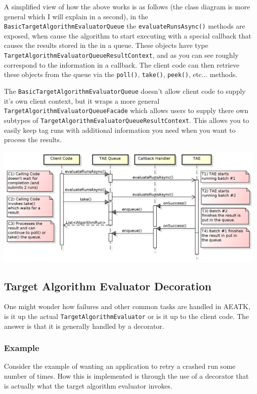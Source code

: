 \documentclass[11pt,letterpaper,oneside]{article}
\begin{document}
A simplified view of how the above works is as follows (the class diagram is more general which I will explain in a second), in the \texttt{BasicTargetAlgorithmEvaluatorQueue} the \texttt{evaluateRunsAsync()} methods are exposed, when cause the algorithm to start executing with a special callback that causes the results stored in the in a queue. These objects have type\\ \texttt{TargetAlgorithmEvaluatorQueueResultContext}, and as you can see roughly correspond to the information in a callback. The client code can then retrieve these objects from the queue via the \texttt{poll()}, \texttt{take()}, \texttt{peek()}, etc... methods.

The \texttt{BasicTargetAlgorithmEvaluatorQueue} doesn't allow client code to supply it's own client context, but it wraps a more general \texttt{TargetAlgorithmEvaluatorQueueFacade} which allows users to supply there own subtypes of \texttt{TargetAlgorithmEvaluatorQueueResultContext}. This allows you to easily keep tag runs with additional information you need when you want to process the results.

\begin{center}
\includegraphics[scale=0.60]{img/UML/TAESequence4.png}
\end{center}

\subsection{Target Algorithm Evaluator Decoration}

One might wonder how failures and other common tasks are handled in AEATK, is it up the actual \texttt{TargetAlgorithmEvaluator} or is it up to the client code. The answer is that it is generally handled by a decorator.

\subsubsection{Example}
 \label{sec:decoration-example}
 Consider the example of wanting an application to retry a crashed run some number of times. How this is implemented is through the use of a decorator that is actually what the target algorithm evaluator invokes.
 
\end{document}
